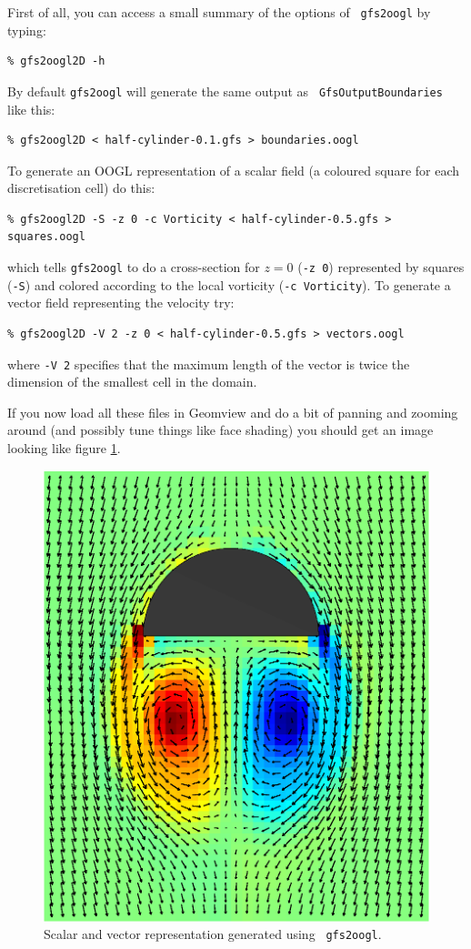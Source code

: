 \documentclass[a4paper]{article}
\begin{document}
First of all, you can access a small summary of the options of {\tt
gfs2oogl} by typing:
\begin{verbatim}
% gfs2oogl2D -h
\end{verbatim}
By default {\tt gfs2oogl} will generate the same output as {\tt
GfsOutputBoundaries} like this:
\begin{verbatim}
% gfs2oogl2D < half-cylinder-0.1.gfs > boundaries.oogl
\end{verbatim}
To generate an {\sc OOGL} representation of a scalar field (a coloured square
for each discretisation cell) do this:
\begin{verbatim}
% gfs2oogl2D -S -z 0 -c Vorticity < half-cylinder-0.5.gfs > squares.oogl
\end{verbatim}
which tells {\tt gfs2oogl} to do a cross-section for $z = 0$ ({\tt -z
0}) represented by squares ({\tt -S}) and colored according to the local
vorticity ({\tt -c Vorticity}).
To generate a vector field representing the velocity try:
\begin{verbatim}
% gfs2oogl2D -V 2 -z 0 < half-cylinder-0.5.gfs > vectors.oogl
\end{verbatim}
where {\tt -V 2} specifies that the maximum length of the vector is
twice the dimension of the smallest cell in the domain.

If you now load all these files in Geomview and do a bit of panning
and zooming around (and possibly tune things like face shading) you
should get an image looking like figure \ref{gfs2oogl}.
\begin{figure}[htbp]
\begin{center}
\includegraphics[angle=90,width=0.6\hsize]{gfs2oogl.eps}
\end{center}
\caption{Scalar and vector representation generated using {\tt
gfs2oogl}.}
\label{gfs2oogl}
\end{figure}
\end{document}
